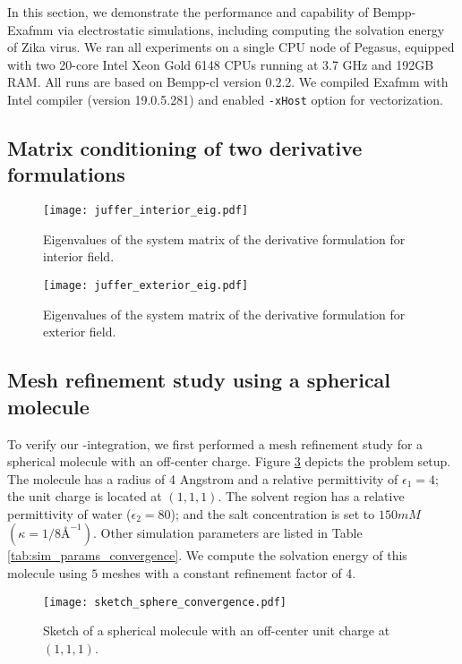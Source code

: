 In this section, we demonstrate the performance and capability of Bempp-Exafmm via electrostatic simulations, including computing the solvation energy of Zika virus.
We ran all experiments on a single CPU node of Pegasus, equipped with two 20-core Intel Xeon Gold 6148 CPUs running at 3.7 GHz and 192GB RAM.
All runs are based on Bempp-cl version 0.2.2.
We compiled Exafmm with Intel compiler (version 19.0.5.281) and enabled \texttt{-xHost} option for vectorization.

\subsection{Matrix conditioning of two derivative formulations}

\begin{figure}[htbp]
    \centering
    \texttt{[image: juffer\_interior\_eig.pdf]}
    \caption{Eigenvalues of the system matrix of the derivative formulation for interior field.}
    \label{fig:juffer_interior_eig}
\end{figure}

\begin{figure}[htbp]
    \centering
    \texttt{[image: juffer\_exterior\_eig.pdf]}
    \caption{Eigenvalues of the system matrix of the derivative formulation for exterior field.}
    \label{fig:juffer_exterior_eig}
\end{figure}

\subsection{Mesh refinement study using a spherical molecule}

To verify our \bem-\fmm integration, we first performed a mesh refinement study for a spherical molecule with an off-center charge.
Figure \ref{fig:sketch_sphere_convergence} depicts the problem setup.
The molecule has a radius of 4 Angstrom and a relative permittivity of $\epsilon_1 = 4$; the unit charge is located at $(1,1,1)$.
The solvent region has a relative permittivity of water ($\epsilon_2 = 80$); and the salt concentration is set to $150mM$ $(\kappa = 1/8 {\si{\angstrom}}^{-1})$.
Other simulation parameters are listed in Table \ref{tab:sim_params_convergence}.
We compute the solvation energy of this molecule using $5$ meshes with a constant refinement factor of 4.

\begin{figure}[htbp]
    \centering
    \texttt{[image: sketch\_sphere\_convergence.pdf]}
    \caption{Sketch of a spherical molecule with an off-center unit charge at $(1,1,1)$.}
    \label{fig:sketch_sphere_convergence}
\end{figure}

